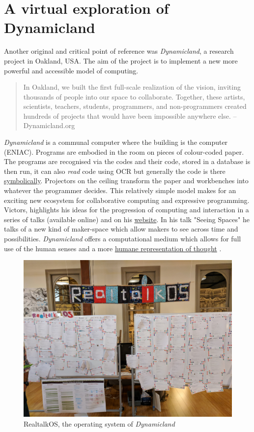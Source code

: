 \documentclass[12pt]{report}
\begin{document}
\section{A virtual exploration of Dynamicland}
\label{sec:org8366e29}

Another original and critical point of reference was \emph{Dynamicland}, a research
project in Oakland, USA. The aim of the project is to implement a new more
powerful and accessible model of computing.

\begin{quote}


In Oakland, we built the first full-scale realization of the vision, inviting
thousands of people into our space to collaborate. Together, these artists,
scientists, teachers, students, programmers, and non-programmers created
hundreds of projects that would have been impossible anywhere else.
-- Dynamicland.org 
\end{quote}


\emph{Dynamicland} is a communal computer where the building is the computer (ENIAC).
Programs are embodied in the room on pieces of colour-coded paper. The programs
are recognised via the codes and their code, stored in a database is then run,
it can also \emph{read} code using OCR but generally the code is there \href{https://thenewstack.io/dynamicland-rethinks-computer-interfaces/}{symbolically}.
Projectors on the ceiling transform the paper and workbenches into whatever the
programmer decides. This relatively simple model makes for an exciting new
ecosystem for collaborative computing and expressive programming. Victors,
highlights his ideas for the progression of computing and interaction in a
series of talks (available online) and on his \href{http://worrydream.com}{website}. In his talk "Seeing
Spaces" he talks of a new kind of maker-space which allow makers to see across
time and possibilities. \emph{Dynamicland} offers a computational medium which allows
for full use of the human senses and a more \href{https://vimeo.com/115154289}{humane representation of thought}
\cite{VictorKayDynamicLand}. \\

\begin{figure}[htbp]
\centering
\includegraphics[width=12cm]{assets/realtalk-os.jpg}
\caption{RealtalkOS, the operating system of \emph{Dynamicland}}
\end{figure}  
\end{document}
